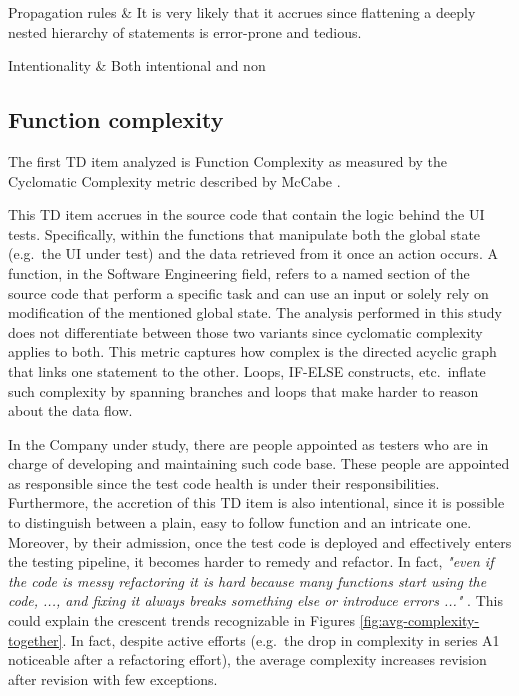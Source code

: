 \begin{table}[!htbp]
\begin{tabu}


			Propagation rules & It is very likely that it accrues since flattening a deeply nested hierarchy of statements is error-prone and tedious.\\
			\hline

			Intentionality & Both intentional and non \\
			\hline

		\end{tabu}
		\label{tab:res-dry-violations}
		\caption[DRY violations specification]{DRY violations specification according to guidelines specified by \cite{mapping_study_td}.}
	\end{table}

	\subsection{Function complexity}


	The first TD item analyzed is Function Complexity as measured by the Cyclomatic Complexity metric described by McCabe \cite{cyclomatic_complexity}.

    This TD item accrues in the source code that contain the logic behind the UI tests. Specifically, within the functions that manipulate both the global state (e.g.\ the UI under test) and the data retrieved from it once an action occurs. A function, in the Software Engineering field, refers to a named section of the source code that perform a specific task and can use an input or solely rely on modification of the mentioned global state. The analysis performed in this study does not differentiate between those two variants since cyclomatic complexity applies to both. This metric captures how complex is the directed acyclic graph that links one statement to the other. Loops, IF-ELSE constructs, etc.\ inflate such complexity by spanning branches and loops that make harder to reason about the data flow.

    In the Company under study, there are people appointed as testers who are in charge of developing and maintaining such code base. These people are appointed as responsible since the test code health is under their responsibilities. Furthermore, the accretion of this TD item is also intentional, since it is possible to distinguish between a plain, easy to follow function and an intricate one. Moreover, by their admission, once the test code is deployed and effectively enters the testing pipeline, it becomes harder to remedy and refactor. In fact, \textit{"even if the code is messy refactoring it is hard because many functions start using the code, ..., and fixing it always breaks something else or introduce errors ..." }. This could explain the crescent trends recognizable in Figures \ref{fig:avg-complexity-together}. In fact, despite active efforts (e.g.\ the drop in complexity in series A1 noticeable after a refactoring effort), the average complexity increases revision after revision with few exceptions.

